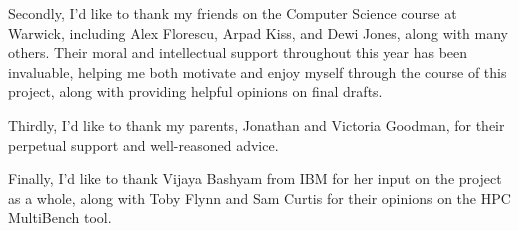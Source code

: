 Secondly, I'd like to thank my friends on the Computer Science course at Warwick, including Alex Florescu, Arpad Kiss, and Dewi Jones, along with many others. Their moral and intellectual support throughout this year has been invaluable, helping me both motivate and enjoy myself through the course of this project, along with providing helpful opinions on final drafts.

Thirdly, I'd like to thank my parents, Jonathan and Victoria Goodman, for their perpetual support and well-reasoned advice.

Finally, I'd like to thank Vijaya Bashyam from IBM for her input on the project as a whole, along with Toby Flynn and Sam Curtis for their opinions on the HPC MultiBench tool. %


